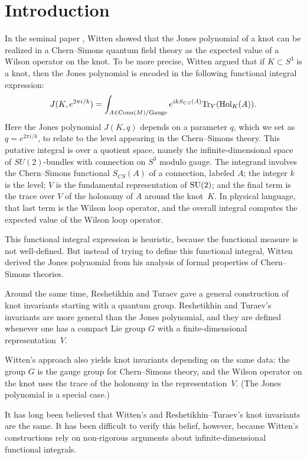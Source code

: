 \documentclass[10pt]{amsart}
\begin{document}
\tableofcontents

\section{Introduction}

In the seminal paper \cite{WitCS}, Witten showed that the Jones polynomial of a knot can be realized in a Chern--Simons quantum field theory 
as the expected value of a Wilson operator on the knot. 
To be more precise, 
Witten argued that if $K \subset S^3$ is a knot, 
then the Jones polynomial is encoded in the following functional integral expression:
$$
J(K, e^{2 \pi i/ k})= \int_{A \in {\rm Conn}(M) / {\rm Gauge} } e^{i k S_{CS}(A)} {\rm Tr}_{V}({\rm Hol}_{K}(A)). 
$$
Here the Jones polynomial $J(K,q)$ depends on a parameter $q$, 
which we set as $q=e^{2 \pi i / k}$, to relate to the level appearing in the Chern--Simons theory. 
This putative integral is over a quotient space, namely the infinite-dimensional space of $SU(2)$-bundles with connection on $S^3$ modulo gauge. 
The integrand involves the Chern--Simons functional $S_{CS}(A)$ of a connection, labeled $A$; 
the integer $k$ is the level; $V$ is the fundamental representation of ${\rm SU}(2)$;
and the final term is the trace over $V$ of the holonomy of $A$ around the knot~$K$.
In physical language, that last term is the Wilson loop operator,
and the overall integral computes the expected value of the Wilson loop operator.

This functional integral expression is heuristic, because the functional measure is not well-defined.  
But instead of trying to define this functional integral, 
Witten derived the Jones polynomial from his analysis of formal properties of Chern--Simons theories.

Around the same time, Reshetikhin and Turaev \cite{RT} gave a general construction of knot invariants starting with a quantum group.    
Reshetikhin and Turaev's invariants are more general than the Jones polynomial, and 
they are defined whenever one has a compact Lie group $G$ with a finite-dimensional representation~$V$.  

Witten's approach also yields knot invariants depending on the same data: 
the group $G$ is the gauge group for Chern--Simons theory, and 
the Wilson operator on the knot uses the trace of the holonomy in the representation~$V$.
(The Jones polynomial is a special case.) 

It has long been believed that Witten's and Reshetikhin--Turaev's knot invariants are the same.  
It has been difficult to verify this belief, however, 
because Witten's constructions rely on non-rigorous arguments about infinite-dimensional functional integrals. 
\end{document}
